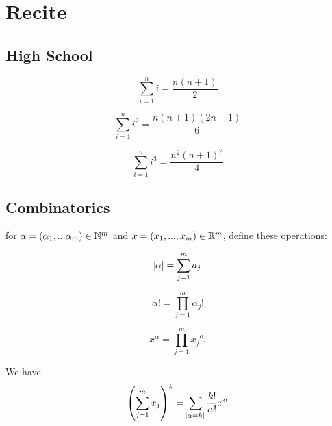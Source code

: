 \chapter{Recite}


\section{High School}

\begin{multicols}{3}
    \begin{equation*}
        \sum_{i=1}^n i = \frac{n (n+1)}{2}
    \end{equation*}
    \columnbreak

    \begin{equation*}
        \sum_{i=1}^n i^2 = \frac{n (n+1) (2n+1)}{6}
    \end{equation*}
    \columnbreak

    \begin{equation*}
        \sum_{i=1}^n i^3 = \frac{n^2 (n+1)^2}{4}
    \end{equation*}
    \columnbreak

\end{multicols}



\section{Combinatorics}


\begin{theorem}
    for $\alpha=(\alpha_1, ... \alpha_m) \in \mathbb{N}^m$ and $x=(x_1, ..., x_m) \in \mathbb{R}^m$, define these operations:
    
    \begin{multicols}{3}
        \begin{equation*}
            \abs{\alpha} = \sum_{j=1}^m a_j
        \end{equation*}
        \columnbreak
        
        \begin{equation*}
            \alpha ! = \prod_{j=1}^m \alpha_j !
        \end{equation*}
        \columnbreak
        
        \begin{equation*}
            x^\alpha = \prod_{j=1}^m {x_j}^{\alpha_j}
        \end{equation*}
        \columnbreak
    \end{multicols}
    
    We have
    \begin{equation}
        \mleft(\sum_{j=1}^m x_j \mright)^k = \sum_{\absolutevalue{\alpha = k}} \frac{k!}{\alpha !} x^\alpha
    \end{equation}
\end{theorem}

